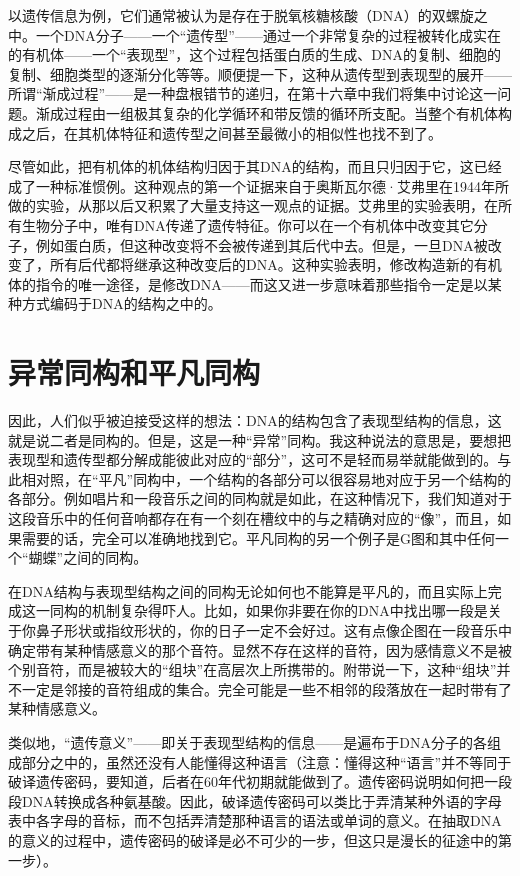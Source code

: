 以遗传信息为例，它们通常被认为是存在于脱氧核糖核酸（DNA）的双螺旋之中。一个DNA分子——一个“遗传型”——通过一个非常复杂的过程被转化成实在的有机体——一个“表现型”，这个过程包括蛋白质的生成、DNA的复制、细胞的复制、细胞类型的逐渐分化等等。顺便提一下，这种从遗传型到表现型的展开——所谓“渐成过程”——是一种盘根错节的递归，在第十六章中我们将集中讨论这一问题。渐成过程由一组极其复杂的化学循环和带反馈的循环所支配。当整个有机体构成之后，在其机体特征和遗传型之间甚至最微小的相似性也找不到了。

尽管如此，把有机体的机体结构归因于其DNA的结构，而且只归因于它，这已经成了一种标准惯例。这种观点的第一个证据来自于奥斯瓦尔德·艾弗里在1944年所做的实验，从那以后又积累了大量支持这一观点的证据。艾弗里的实验表明，在所有生物分子中，唯有DNA传递了遗传特征。你可以在一个有机体中改变其它分子，例如蛋白质，但这种改变将不会被传递到其后代中去。但是，一旦DNA被改变了，所有后代都将继承这种改变后的DNA。这种实验表明，修改构造新的有机体的指令的唯一途径，是修改DNA——而这又进一步意味着那些指令一定是以某种方式编码于DNA的结构之中的。

\section{异常同构和平凡同构}

因此，人们似乎被迫接受这样的想法：DNA的结构包含了表现型结构的信息，这就是说二者是同构的。但是，这是一种“异常”同构。我这种说法的意思是，要想把表现型和遗传型都分解成能彼此对应的“部分”，这可不是轻而易举就能做到的。与此相对照，在“平凡”同构中，一个结构的各部分可以很容易地对应于另一个结构的各部分。例如唱片和一段音乐之间的同构就是如此，在这种情况下，我们知道对于这段音乐中的任何音响都存在有一个刻在槽纹中的与之精确对应的“像”，而且，如果需要的话，完全可以准确地找到它。平凡同构的另一个例子是G图和其中任何一个“蝴蝶”之间的同构。

在DNA结构与表现型结构之间的同构无论如何也不能算是平凡的，而且实际上完成这一同构的机制复杂得吓人。比如，如果你非要在你的DNA中找出哪一段是关于你鼻子形状或指纹形状的，你的日子一定不会好过。这有点像企图在一段音乐中确定带有某种情感意义的那个音符。显然不存在这样的音符，因为感情意义不是被个别音符，而是被较大的“组块”在高层次上所携带的。附带说一下，这种“组块”并不一定是邻接的音符组成的集合。完全可能是一些不相邻的段落放在一起时带有了某种情感意义。

类似地，“遗传意义”——即关于表现型结构的信息——是遍布于DNA分子的各组成部分之中的，虽然还没有人能懂得这种语言（注意：懂得这种“语言”并不等同于破译遗传密码，要知道，后者在60年代初期就能做到了。遗传密码说明如何把一段段DNA转换成各种氨基酸。因此，破译遗传密码可以类比于弄清某种外语的字母表中各字母的音标，而不包括弄清楚那种语言的语法或单词的意义。在抽取DNA的意义的过程中，遗传密码的破译是必不可少的一步，但这只是漫长的征途中的第一步）。

